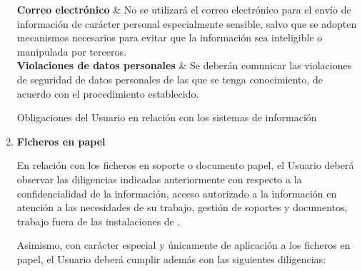 \begin{enumerate}[label=\alph*)]
\begin{table}[H]
{            \textbf{Correo electrónico} & No se utilizará el correo electrónico para el envío de información de carácter personal especialmente sensible, salvo que se adopten mecanismos necesarios para evitar que la información sea inteligible o manipulada por terceros. \\ \hline
            \textbf{Violaciones de datos personales} & Se deberán comunicar las violaciones de seguridad de datos personales de las que se tenga conocimiento, de acuerdo con el procedimiento establecido. \\ \hline
        }
        \caption{Obligaciones del Usuario en relación con los sistemas de información}
        \label{tab:guia-sgsi-obligaciones-usuario-sistemas}
        \normalsize
    \end{table}

    \item \textbf{Ficheros en papel}

    En relación con los ficheros en soporte o documento papel, el Usuario deberá observar las diligencias indicadas anteriormente con respecto a la confidencialidad de la información, acceso autorizado a la información en atención a las necesidades de su trabajo, gestión de soportes y documentos, trabajo fuera de las instalaciones de \Beneficiario{}.

    Asimismo, con carácter especial y únicamente de aplicación a los ficheros en papel, el Usuario deberá cumplir además con las siguientes diligencias:


\end{enumerate}
